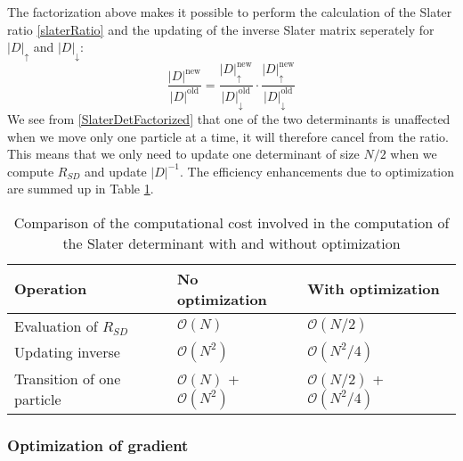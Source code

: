 \documentclass[english, a4paper]{article}
\begin{document}
\noindent The factorization above makes it possible to perform the calculation of the Slater ratio \eqref{slaterRatio}
and the updating of the inverse Slater matrix seperately for $|D|_\uparrow$ and $|D|_\downarrow$:
\begin{equation}
 \frac{|D|^{\textrm{new}}}{|D|^{\textrm{old}}} = \frac{|D|^{\textrm{new}}_\uparrow}{|D|^{\textrm{old}}_\downarrow}
 \cdot
 \frac{|D|^{\textrm{new}}_\uparrow}{|D|^{\textrm{old}}_\downarrow}
\end{equation}
We see from \eqref{SlaterDetFactorized} that one of the two determinants is unaffected
when we move only one particle at a time, it will therefore cancel from the ratio. This means
that we only need to update one determinant of size $N/2$ when we compute $R_{SD}$
and update $|D|^{-1}$. The efficiency enhancements due to optimization are summed up in Table \ref{tab:Optimization}.
\begin{table}[H] 
  \begin{center}
    \begin{tabular*}{14cm}{@{\extracolsep{\fill}} lll}
      \toprule
      Operation & No optimization & With optimization  \\ 
      \hline
      Evaluation of $R_{SD}$  & $\mathcal{O}(N)$ & $\mathcal{O}(N/2)$ \\
      Updating inverse  & $\mathcal{O}(N^2)$ & $\mathcal{O}(N^2/4)$ \\ 
      Transition of one particle & $\mathcal{O}(N)$ + $\mathcal{O}(N^2)$ &
                                   $\mathcal{O}(N/2)$ + $\mathcal{O}(N^2/4)$ \\ 
      \bottomrule
      \end{tabular*} 
    \end{center}
      \caption {Comparison of the computational cost involved in the computation of the
                Slater determinant with and without optimization} 
  \label{tab:Optimization} 
\end{table}

\subsubsection{Optimization of gradient}
\end{document}
